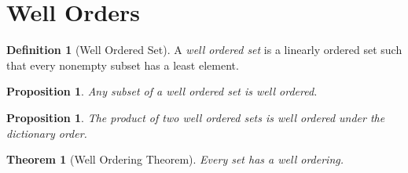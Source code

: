 \documentclass{book}
\newtheorem{prop}[ax]{Proposition}
\newtheorem{thm}[ax]{Theorem}
\theoremstyle{definition}
\newtheorem{df}[ax]{Definition}
\begin{document}
\section{Well Orders}

\begin{df}[Well Ordered Set]
A \emph{well ordered set} is a linearly ordered set such that every nonempty subset has a least element.
\end{df}

\begin{prop}
Any subset of a well ordered set is well ordered.
\end{prop}

\begin{prop}
The product of two well ordered sets is well ordered under the dictionary order.
\end{prop}

\begin{thm}[Well Ordering Theorem]
Every set has a well ordering.
\end{thm}
\end{document}
